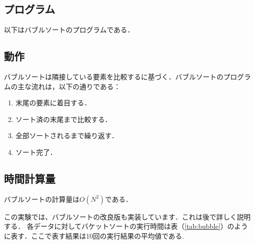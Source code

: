 \documentclass[a4j, titlepage]{jarticle}
\begin{document}
        \subsection{プログラム}
            以下はバブルソートのプログラムである．
            

        \subsection{動作}
            バブルソートは隣接している要素を比較するに基づく．バブルソートのプログラムの主な流れは，以下の通りである：
            \begin{screen}
                    \begin{enumerate}
                        \item 末尾の要素に着目する．
                        \item ソート済の末尾まで比較する．
                        \item 全部ソートされるまで繰り返す．
                        \item ソート完了．
                    \end{enumerate}    
            \end{screen}

        \subsection{時間計算量}
            バブルソートの計算量は$ O(N^2) $である．

            この実験では、バブルソートの改良版も実装しています．これは後で詳しく説明する．
            各データに対してバケットソートの実行時間は表（\ref{tab:bubble}）のように表す．ここで表す結果は10回の実行結果の平均値である.
\end{document}
